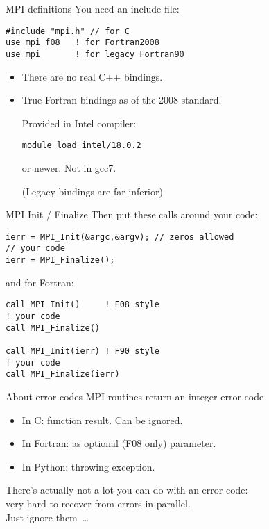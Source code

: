
\begin{mpithree}
\begin{frame}[containsverbatim]{MPI definitions}
\label{sl:mpi-header}
You need an include file:
\begin{verbatim}
#include "mpi.h" // for C
use mpi_f08   ! for Fortran2008
use mpi       ! for legacy Fortran90
\end{verbatim}
\begin{itemize}
\item There are no real C++ bindings.
\item True Fortran bindings as of the 2008 standard.
\begin{tacc}
Provided in Intel compiler:
\begin{verbatim}
module load intel/18.0.2
\end{verbatim}
or newer. Not in gcc7.
\end{tacc}
(Legacy bindings are far inferior)
\end{itemize}
\end{frame}

\begin{frame}[containsverbatim]{MPI Init / Finalize}
Then put these calls around your code:
\lstset{language=C}
\begin{lstlisting}
ierr = MPI_Init(&argc,&argv); // zeros allowed
// your code
ierr = MPI_Finalize();  
\end{lstlisting}
and for Fortran:
\lstset{language=Fortran}
\begin{lstlisting}
call MPI_Init()     ! F08 style
! your code
call MPI_Finalize()

call MPI_Init(ierr) ! F90 style
! your code
call MPI_Finalize(ierr)
\end{lstlisting}
\end{frame}
\end{mpithree}

\begin{frame}{About error codes}
  MPI routines return an integer error code
  \begin{itemize}
  \item In C: function result. Can be ignored.
  \item In Fortran: as optional (F08 only) parameter.
  \item In Python: throwing exception.
  \end{itemize}
  There's actually not a lot you can do with an error code:\\
  very hard to recover from errors in parallel.\\
  Just ignore them~\ldots
\end{frame}


